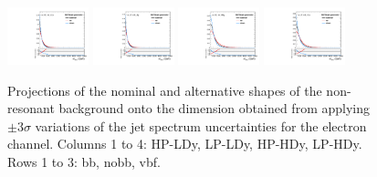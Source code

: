 \begin{figure}[htbp]
  \includegraphics[width=0.21\textwidth]{fig/uncertainties/systs_nonRes_e_HP_vbf_LDy_MVVScale_ProjX.pdf}
  \includegraphics[width=0.21\textwidth]{fig/uncertainties/systs_nonRes_e_LP_vbf_LDy_MVVScale_ProjX.pdf}
  \includegraphics[width=0.21\textwidth]{fig/uncertainties/systs_nonRes_e_HP_vbf_HDy_MVVScale_ProjX.pdf}
  \includegraphics[width=0.21\textwidth]{fig/uncertainties/systs_nonRes_e_LP_vbf_HDy_MVVScale_ProjX.pdf}\\
  \caption{
    Projections of the nominal and alternative shapes of the non-resonant background onto the \MVV dimension obtained from applying $\pm3\sigma$ variations of the jet \pt spectrum uncertainties for the electron channel.
    Columns 1 to 4: HP-LDy, LP-LDy, HP-HDy, LP-HDy.
    Rows 1 to 3: bb, nobb, vbf.
  }
  \label{fig:systNonResMVV_MVVScale}
\end{figure}

